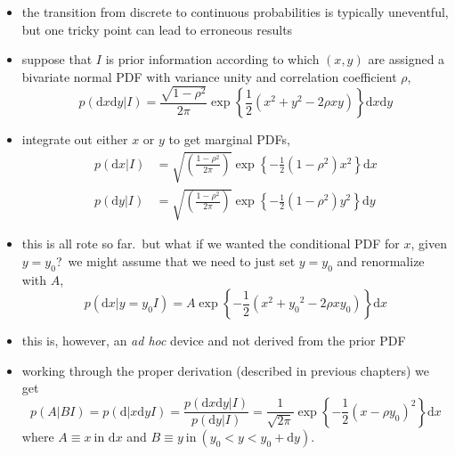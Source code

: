 \documentclass[../jaynes_prob_theory_notes.tex]{subfiles}
\begin{document}
            \begin{itemize} 
                \item the transition from discrete to continuous probabilities is typically uneventful, but one tricky point can lead to erroneous results
                \item suppose that \(I\) is prior information according to which \((x,y)\) are assigned a bivariate normal PDF with variance unity and correlation coefficient \(\rho\),
                    \begin{equation*} 
                        p(\text{d}x\text{d}y|I) = \frac{\sqrt{1 - {\rho}^2}}{2\pi} \exp \left \{ \frac{1}{2} (x^2 + y^2 - 2\rho x y) \right \} \text{d}x\text{d}y
                    \end{equation*}
                \item integrate out either \(x\) or \(y\) to get marginal PDFs,
                    \begin{align*}
                        p(\text{d}x|I) &= \sqrt{\left( \frac{1-{\rho}^2}{2\pi} \right)} \exp \left \{ -\frac{1}{2}(1-{\rho}^2)x^2 \right \} \text{d}x \\
                        p(\text{d}y|I) &= \sqrt{\left( \frac{1-{\rho}^2}{2\pi} \right)} \exp \left \{ -\frac{1}{2}(1-{\rho}^2)y^2 \right \} \text{d}y 
                    \end{align*}
                \item this is all rote so far.\ but what if we wanted the conditional PDF for \(x\), given \(y = y_0\)?\ we might assume that we need to just set \(y = y_0\) and renormalize with \(A\),
                    \begin{equation*} 
                        p(\text{d}x|y=y_0 I) = A \exp \left \{ -\frac{1}{2} (x^2 + {y_0}^2 - 2\rho x y_0) \right \} \text{d}x
                    \end{equation*}
                \item this is, however, an \textit{ad hoc} device and not derived from the prior PDF
                \item working through the proper derivation (described in previous chapters) we get
                    \begin{equation*} 
                        p(A|BI) = p(\text{d}|x\text{d}y I) = \frac{p(\text{d}x\text{d}y|I)}{p(\text{d}y|I)} = \frac{1}{\sqrt{2\pi}} \exp \left \{ -\frac{1}{2} {(x-\rho y_0)}^2 \right \} \text{d}x
                    \end{equation*}
                    where \(A \equiv x~\text{in d}x\) and \(B \equiv y~\text{in}~(y_0 < y < y_0 + \text{d}y)\).

\end{itemize}
\end{document}

